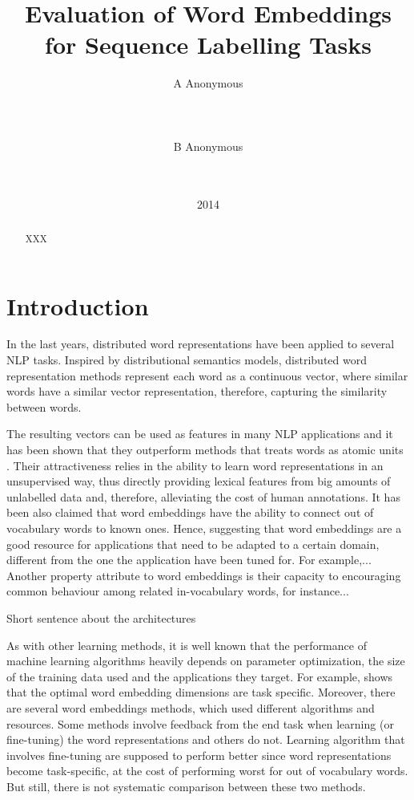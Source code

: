 \documentclass[11pt]{article}
\title{Evaluation of Word Embeddings for Sequence Labelling Tasks}
\author{A Anonymous 
   \\%
   \\ %
   \\ %
  \\ %
\And
  B Anonymous
   \\%
   \\%
   \\ %
}
\date{2014}
\begin{document}
\maketitle
\begin{abstract}
XXX
\end{abstract}

\newcommand{\gabi}[1]{\textcolor{blue}{#1}}
\newcommand{\tim}[1]{\textcolor{red}{#1}}
\newcommand{\lizhen}[1]{\textcolor{green}{#1}}
\newcommand{\nss}[1]{\textcolor{magenta}{#1}}

\section{Introduction}
In the last years, distributed word representations
have been applied to several NLP tasks.
Inspired by distributional semantics models, distributed word
representation methods represent each word as a continuous vector, where similar words have a similar vector representation, therefore, capturing the similarity between words.

The resulting vectors can be used as features in many NLP applications and it has been shown that they outperform methods that treats words as atomic units \cite{}.  
Their attractiveness relies in the ability to learn word representations in an unsupervised way, thus directly providing lexical features from big amounts of unlabelled data 
and, therefore, alleviating the cost of human annotations.
It has been also claimed that word embeddings
have the ability to connect out of vocabulary words to known ones.
Hence, suggesting that word embeddings are a good resource 
for applications that need to be adapted to a certain domain, 
different from the one the application have been tuned for.
For example,...
Another property attribute to word embeddings is their 
capacity to encouraging common behaviour among related in-vocabulary words, for instance...

{\color{red}Short sentence about the architectures}

As with other learning methods, it is well known that
the performance of machine learning algorithms heavily depends on
parameter optimization, the size of the training data used and the applications they target.
For example, \cite{turian2010word} shows that the optimal word embedding dimensions are task specific.
Moreover, there are several word embeddings methods, which used different algorithms and resources. 
Some methods involve feedback from the end task when learning (or fine-tuning) the word representations and others do not. 
Learning algorithm that involves fine-tuning are supposed
to perform better since word representations become
task-specific, at the cost of performing worst for out of vocabulary 
words. But still, there is not systematic comparison between
these two methods. 
\end{document}

